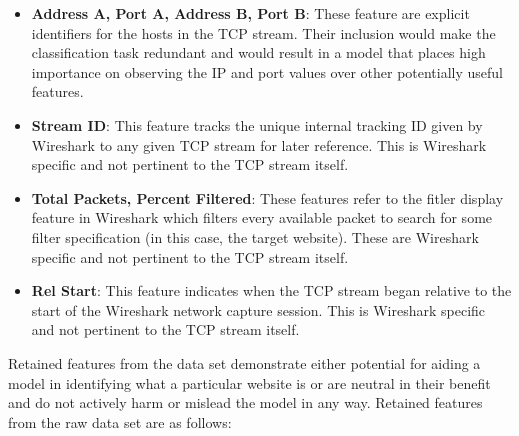 \documentclass[10pt,sigconf,letterpaper,nonacm]{acmart}
\begin{document}
\begin{itemize}
  \item \textbf{Address A, Port A, Address B, Port B}: These feature are explicit identifiers for the hosts in the TCP stream. Their inclusion would make the classification task redundant and would result in a model that places high importance on observing the IP and port values over other potentially useful features.
  
  \item \textbf{Stream ID}: This feature tracks the unique internal tracking ID given by Wireshark to any given TCP stream for later reference. This is Wireshark specific and not pertinent to the TCP stream itself.
  
  \item \textbf{Total Packets, Percent Filtered}: These features refer to the fitler display feature in Wireshark which filters every available packet to search for some filter specification (in this case, the target website). These are Wireshark specific and not pertinent to the TCP stream itself.
  
  \item \textbf{Rel Start}: This feature indicates when the TCP stream began relative to the start of the Wireshark network capture session. This is Wireshark specific and not pertinent to the TCP stream itself.
\end{itemize}

Retained features from the data set demonstrate either potential for aiding a model in identifying what a particular website is or are neutral in their benefit and do not actively harm or mislead the model in any way.
Retained features from the raw data set are as follows:
\end{document}
